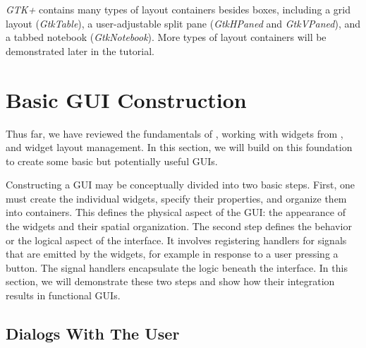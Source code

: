 \documentclass[article]{jss}
\begin{document}
\emph{GTK+} contains many types of layout containers besides boxes, including 
a grid layout (\emph{GtkTable}), a user-adjustable split pane (\emph{GtkHPaned}
and \emph{GtkVPaned}), and a tabbed notebook (\emph{GtkNotebook}). More types of
layout containers will be demonstrated later in the tutorial.

\section{Basic GUI Construction}


Thus far, we have reviewed the fundamentals of , working with
 widgets from , and widget layout management. In this
section, we will build on this foundation to create some basic but potentially
useful GUIs. 

Constructing a GUI may be conceptually divided into two basic steps.
First, one must create the individual widgets, specify their properties,
and organize them into containers. This defines the physical aspect
of the GUI: the appearance of the widgets and their spatial organization.
The second step defines the behavior or the logical aspect of the
interface. It involves registering handlers for signals that are emitted
by the widgets, for example in response to a user pressing a button.
The signal handlers encapsulate the logic beneath the interface. In this
section, we will demonstrate these two steps and show how their integration
results in functional GUIs.

\subsection{Dialogs With The User}
\end{document}
